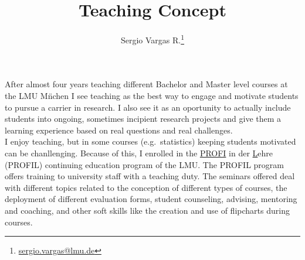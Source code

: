 \documentclass[a4paper,11pt]{article}
\makeatletter
\renewcommand{\maketitle}{\bgroup\setlength{\parindent}{0pt}
\begin{flushleft}
  \thispagestyle{plain}
  \textbf{\@title}

  \@author
\end{flushleft}\egroup
}
\renewenvironment{abstract}
 {\small
  \begin{flushleft}
  \textbf{\abstractname}\vspace{-0.40em}\vspace{0pt}
  \end{flushleft}
  \list{}{
    \setlength{\leftmargin}{0cm}%
    \setlength{\rightmargin}{\leftmargin}%
  }%
  \item\relax}
 {\endlist}
\makeatother
\begin{document}
\title{\Large Teaching Concept\newline}

\author[1]{Sergio Vargas R.\footnote[2]{\href{sergio.vargas@lmu.de}{sergio.vargas@lmu.de}}}


\date{}

\maketitle


After almost four years teaching different Bachelor and Master level courses at the LMU M\"nchen I see teaching as the best way to engage and motivate students to pursue a carrier in research. I also see it as an oportunity to actually include students into ongoing, sometimes incipient research projects and give them a learning experience based on real questions and real challenges.\\

I enjoy teaching, but in some courses (e.g.~statistics) keeping students motivated can be chanllenging. Because of this, I enrolled in the \underline{PROFI} in der \underline{L}ehre (PROFIL) continuing education program of the LMU. The PROFIL program offers training to university staff with a teaching duty. The seminars offered deal with different topics related to the conception of different types of courses, the deployment of different evaluation forms, student counseling, advising, mentoring and coaching, and other soft skills like the creation and use of flipcharts during courses.\\
\end{document}
